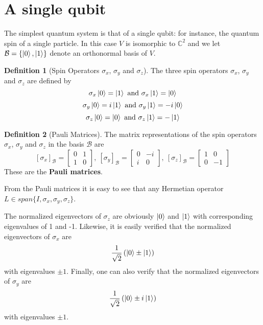 \documentclass[11pt]{article}
\theoremstyle{definition}
\newtheorem{definition}{Definition}[section]
\begin{document}
\section{A single qubit}
The simplest quantum system is that of a single qubit: for instance, the quantum spin of a single particle. In this case $V$ is isomorphic to $\mathbb{C}^2$ and we let $\mathcal{B} = \{ \ket{0}, \ket{1} \}$ denote an orthonormal basis of $V$.
\begin{definition}[Spin Operators $\sigma_x$, $\sigma_y$ and $\sigma_z$]
The three spin operators \textbf{$\sigma_x$}, $\sigma_y$ and $\sigma_z$ are defined by
$$\sigma_x \ket{0} = \ket{1} \ \mathrm{and} \ \sigma_x \ket{1} = \ket{0}$$ $$\sigma_y \ket{0} = i\ket{1} \ \mathrm{and} \ \sigma_y \ket{1} = -i\ket{0}$$ $$\sigma_z \ket{0} = \ket{0} \ \mathrm{and} \ \sigma_z \ket{1} = -\ket{1}$$
\end{definition}
\begin{definition}[Pauli Matrices]
The matrix representations of the spin operators $\sigma_x$, $\sigma_y$ and $\sigma_z$ in the basis $\mathcal{B}$ are
$$
\left[ \sigma_x \right]_{\mathcal{B}} = \begin{bmatrix}
0 & 1 \\ 1 & 0
\end{bmatrix}
,
\
\left[ \sigma_y \right]_{\mathcal{B}} = \begin{bmatrix}
0 & -i \\ i & 0
\end{bmatrix}
,
\
\left[ \sigma_z \right]_{\mathcal{B}} = \begin{bmatrix}
1 & 0 \\ 0 & -1
\end{bmatrix}
$$
These are the \textbf{Pauli matrices}.
\end{definition}

From the Pauli matrices it is easy to see that any Hermetian operator $L \in span \{ I, \sigma_x, \sigma_y, \sigma_z \}$.

The normalized eigenvectors of $\sigma_z$ are obviously $\ket{0}$ and $\ket{1}$ with corresponding eigenvalues of 1 and -1. Likewise, it is easily verified that the normalized eigenvectors of $\sigma_x$ are $$\frac{1}{\sqrt{2}} \left( \ket{0} \pm \ket{1} \right)$$ with eigenvalues $\pm 1$. Finally, one can also verify that the normalized eigenvectors of $\sigma_y$ are $$\frac{1}{\sqrt{2}} \left( \ket{0} \pm i\ket{1} \right)$$ with eigenvalues $\pm 1$.
\end{document}
